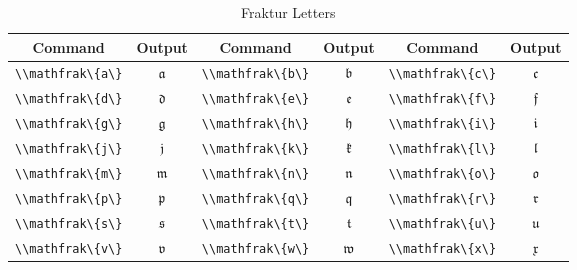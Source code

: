 \begin{table}[htbp]
	\centering
	\caption{Fraktur Letters}
	\label{tab:frak_letters}
	\begin{tabularx}{\linewidth}{CcCcCc}
		\toprule
		\textbf{Command} & \textbf{Output} & \textbf{Command} & \textbf{Output} & \textbf{Command} & \textbf{Output} \\
		\midrule
		\lstinline|\\mathfrak\{a\}| & \(\mathfrak{a}\) & \lstinline|\\mathfrak\{b\}| & \(\mathfrak{b}\) & \lstinline|\\mathfrak\{c\}| & \(\mathfrak{c}\) \\
		\lstinline|\\mathfrak\{d\}| & \(\mathfrak{d}\) & \lstinline|\\mathfrak\{e\}| & \(\mathfrak{e}\) & \lstinline|\\mathfrak\{f\}| & \(\mathfrak{f}\) \\
		\lstinline|\\mathfrak\{g\}| & \(\mathfrak{g}\) & \lstinline|\\mathfrak\{h\}| & \(\mathfrak{h}\) & \lstinline|\\mathfrak\{i\}| & \(\mathfrak{i}\) \\
		\lstinline|\\mathfrak\{j\}| & \(\mathfrak{j}\) & \lstinline|\\mathfrak\{k\}| & \(\mathfrak{k}\) & \lstinline|\\mathfrak\{l\}| & \(\mathfrak{l}\) \\
		\lstinline|\\mathfrak\{m\}| & \(\mathfrak{m}\) & \lstinline|\\mathfrak\{n\}| & \(\mathfrak{n}\) & \lstinline|\\mathfrak\{o\}| & \(\mathfrak{o}\) \\
		\lstinline|\\mathfrak\{p\}| & \(\mathfrak{p}\) & \lstinline|\\mathfrak\{q\}| & \(\mathfrak{q}\) & \lstinline|\\mathfrak\{r\}| & \(\mathfrak{r}\) \\
		\lstinline|\\mathfrak\{s\}| & \(\mathfrak{s}\) & \lstinline|\\mathfrak\{t\}| & \(\mathfrak{t}\) & \lstinline|\\mathfrak\{u\}| & \(\mathfrak{u}\) \\
		\lstinline|\\mathfrak\{v\}| & \(\mathfrak{v}\) & \lstinline|\\mathfrak\{w\}| & \(\mathfrak{w}\) & \lstinline|\\mathfrak\{x\}| & \(\mathfrak{x}\) \\

\end{tabularx}
\end{table}
